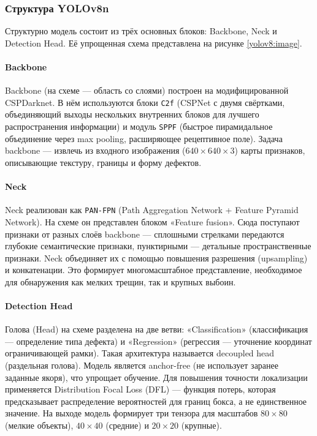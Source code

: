 \subsubsection{Структура YOLOv8n}

Структурно модель состоит из трёх основных блоков: Backbone, Neck и Detection Head. Её упрощенная схема представлена на рисунке \ref{yolov8:image}.

\paragraph{Backbone}
Backbone (на схеме — область со слоями) построен на модифицированной CSPDarknet. В нём используются блоки \texttt{C2f} (CSPNet с двумя свёртками, объединяющий выходы нескольких внутренних блоков для лучшего распространения информации) и модуль \texttt{SPPF} (быстрое пирамидальное объединение через max pooling, расширяющее рецептивное поле). Задача backbone — извлечь из входного изображения ($640\times640\times3$) карты признаков, описывающие текстуру, границы и форму дефектов.

\paragraph{Neck}
Neck реализован как \texttt{PAN-FPN} (Path Aggregation Network + Feature Pyramid Network). На схеме он представлен блоком «Feature fusion». Сюда поступают признаки от разных слоёв backbone — сплошными стрелками передаются глубокие семантические признаки, пунктирными — детальные пространственные признаки. Neck объединяет их с помощью повышения разрешения (upsampling) и конкатенации. Это формирует многомасштабное представление, необходимое для обнаружения как мелких трещин, так и крупных выбоин.

\paragraph{Detection Head}
Голова (Head) на схеме разделена на две ветви: «Classification» (классификация — определение типа дефекта) и «Regression» (регрессия — уточнение координат ограничивающей рамки). Такая архитектура называется decoupled head (раздельная голова). Модель является anchor-free (не использует заранее заданные якоря), что упрощает обучение. Для повышения точности локализации применяется Distribution Focal Loss (DFL) — функция потерь, которая предсказывает распределение вероятностей для границ бокса, а не единственное значение. На выходе модель формирует три тензора для масштабов $80\times80$ (мелкие объекты), $40\times40$ (средние) и $20\times20$ (крупные).


